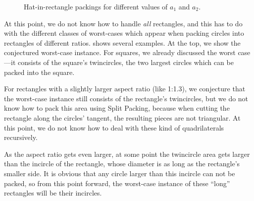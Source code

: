 \documentclass[a4paper,style=print,oneside,bibliography=totoc,nexus,lnum,extramargin]{tubsbook}
\begin{document}
\begin{figure}

    \vspace{5mm}


    \caption{Hat-in-rectangle packings for different values of $a_1$ and $a_2$.}
    \label{fig:hats-in-rect}
\end{figure}

At this point, we do not know how to handle \emph{all} rectangles, and this has to do with the different classes of worst-cases which appear when packing circles into rectangles of different ratios.  shows several examples. At the top, we show the conjectured worst-case instance. For squares, we already discussed the worst case---it consists of the square's twincircles, the two largest circles which can be packed into the square.

For rectangles with a slightly larger aspect ratio (like 1:1.3), we conjecture that the worst-case instance still consists of the rectangle's twincircles, but we do not know how to pack this area using Split Packing, because when cutting the rectangle along the circles' tangent, the resulting pieces are not triangular. At this point, we do not know how to deal with these kind of quadrilaterals recursively.

As the aspect ratio gets even larger, at some point the twincircle area gets larger than the incircle of the rectangle, whose diameter is as long as the rectangle's smaller side. It is obvious that any circle larger than this incircle can not be packed, so from this point forward, the worst-case instance of these “long” rectangles will be their incircles.
\end{document}
